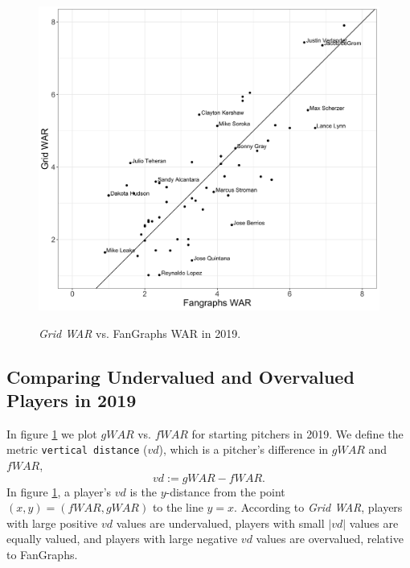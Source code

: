 \documentclass[12pt]{article}
\begin{document}
\begin{figure}[t!]
\centering
\caption{\textit{Grid WAR} vs. FanGraphs WAR in 2019.} 
\includegraphics[width=15cm]{../writeup_plots/plot_gwar_vs_fwar_2019.png}
\label{fig:gwarVfwar19}
\end{figure}

\subsection{Comparing Undervalued and Overvalued Players in 2019}

In figure \ref{fig:gwarVfwar19} we plot $gWAR$ vs. $fWAR$ for starting pitchers in 2019.
 We define the metric \texttt{vertical distance} ($vd$), which is a pitcher's difference in $gWAR$ and $fWAR$,
\begin{equation}
vd := gWAR - fWAR.
\label{eqn:vd}
\end{equation}
In figure \ref{fig:gwarVfwar19}, a player's $vd$ is the $y$-distance from the point $(x,y)=(fWAR,gWAR)$ to the line $y=x$. According to \textit{Grid WAR}, players with large positive $vd$ values are undervalued, players with small $|vd|$ values are equally valued, and players with large negative $vd$ values are overvalued, relative to FanGraphs.
\end{document}
